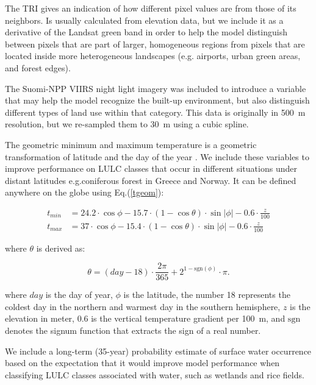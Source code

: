     The TRI \citep{riley1999index} gives an indication of how different pixel values are from those of its neighbors. Is usually calculated from elevation data, but we include it as a derivative of the Landsat green band in order to help the model distinguish between pixels that are part of larger, homogeneous regions from pixels that are located inside more heterogeneous landscapes (e.g. airports, urban green areas, and forest edges).
        
    The Suomi-NPP VIIRS night light imagery \citep{hillger2013first} was included to introduce a variable that may help the model recognize the built-up environment, but also distinguish different types of land use within that category. This data is originally in 500~m resolution, but we re-sampled them to 30~m using a cubic spline.
    
    The geometric minimum and maximum temperature is a geometric transformation of latitude and the day of the year \citep{kilibarda2014spatio}. We include these variables to improve performance on LULC classes that occur in different situations under distant latitudes e.g.\@ coniferous forest in Greece and Norway. It can be defined anywhere on the globe using Eq.(\ref{tgeom}):
        
    \begin{align}
    \label{tgeom}
    t_{min} &= 24.2 \cdot \cos\phi -15.7 \cdot (1-\cos\theta) \cdot \sin|\phi| - 0.6 \cdot \frac{z}{100}  \\
    t_{max} &= 37 \cdot \cos\phi -15.4 \cdot (1-\cos\theta) \cdot \sin|\phi| - 0.6 \cdot \frac{z}{100}
    \end{align}
    
    \noindent where $\theta$ is derived as:
    
    \begin{equation}
    \label{eq:teta}
    \theta = (day-18) \cdot \frac{2\pi}{365} + 2^{1-\mathrm{sgn}(\phi)} \cdot \pi.
    \end{equation}
    
    \noindent where $day$ is the day of year, $\phi$ is the latitude, the number 18 represents the coldest day in the northern and warmest day in the southern hemisphere, $z$ is the elevation in meter, 0.6 is the vertical temperature gradient per 100~m, and $\mathrm{sgn}$ denotes the signum function that extracts the sign of a real number. 
        
    We include a long-term (35-year) probability estimate of surface water occurrence \citep{pekel2016high} based on the expectation that it would improve model performance when classifying LULC classes associated with water, such as wetlands and rice fields.

